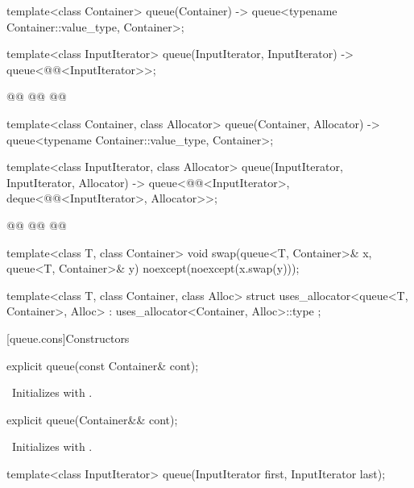 \documentclass{wg21}
\begin{document}
\begin{codeblock}
{    template<class Container>
    queue(Container) -> queue<typename Container::value_type, Container>;

    template<class InputIterator>
    queue(InputIterator, InputIterator) -> queue<@@<InputIterator>>;


    @@
    @@
    @@

    template<class Container, class Allocator>
    queue(Container, Allocator) -> queue<typename Container::value_type, Container>;

    template<class InputIterator, class Allocator>
    queue(InputIterator, InputIterator, Allocator)
    -> queue<@@<InputIterator>, deque<@@<InputIterator>, Allocator>>;

    @@
    @@
    @@

    template<class T, class Container>
    void swap(queue<T, Container>& x, queue<T, Container>& y) noexcept(noexcept(x.swap(y)));

    template<class T, class Container, class Alloc>
    struct uses_allocator<queue<T, Container>, Alloc>
    : uses_allocator<Container, Alloc>::type { };
}
\end{codeblock}

[queue.cons]{Constructors}

\begin{itemdecl}
    explicit queue(const Container& cont);
\end{itemdecl}

\begin{itemdescr}
    \pnum
    \effects\ Initializes  with .
\end{itemdescr}

\begin{itemdecl}
    explicit queue(Container&& cont);
\end{itemdecl}

\begin{itemdescr}
    \pnum
    \effects\ Initializes  with .
\end{itemdescr}

\begin{itemdecl}
    template<class InputIterator>
    queue(InputIterator first, InputIterator last);
\end{itemdecl}
\end{document}
